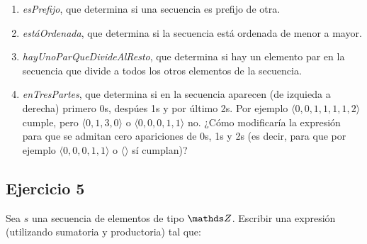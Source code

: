 \begin{enumerate}[label=\alph*)]
      \item \textit{esPrefijo}, que determina si una secuencia es prefijo de otra.


      \item \textit{estáOrdenada}, que determina si la secuencia está ordenada de menor a mayor.


      \item \textit{hayUnoParQueDivideAlResto}, que determina si hay un elemento par en la secuencia que divide a todos los otros elementos de la secuencia.



      \item \textit{enTresPartes}, que determina si en la secuencia aparecen (de izquieda a derecha) primero 0s, despúes 1s y por último 2s. Por ejemplo $\langle 0, 0, 1, 1, 1, 1, 2 \rangle$ cumple, pero $\langle 0, 1, 3, 0 \rangle$ o $\langle 0, 0, 0, 1, 1 \rangle$ no. ¿Cómo modificaría la expresión para que se admitan cero apariciones de 0s, 1s y 2s (es decir, para que por ejemplo $\langle 0, 0, 0, 1, 1 \rangle$ o $\langle \rangle$ sí cumplan)?


\end{enumerate}

\subsection{Ejercicio 5}
Sea $s$ una secuencia de elementos de tipo $\ent$. Escribir una expresión (utilizando sumatoria y productoria) tal que:

